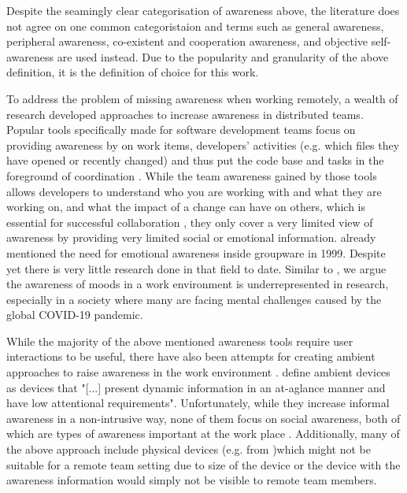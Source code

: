 Despite the seamingly clear categorisation of awareness above, the literature does not agree on one common categoristaion and terms such as general awareness, peripheral awareness, co-existent and cooperation awareness, and objective self-awareness are used instead. Due to the popularity and granularity of the above definition, it is the definition of choice for this work.

To address the problem of missing awareness when working remotely, a wealth of research developed approaches to increase awareness in distributed teams. Popular tools specifically made for software development teams focus on providing awareness by on work items, developers' activities (e.g. which files they have opened or recently changed) and thus put the code base and tasks in the foreground of coordination \autocite{biehl2007fastdash, jakobsen2009wipdash, eick1992seesoft, deline2005easing}. While the team awareness gained by those tools allows developers to understand who you are working with and what they are working on, and what the impact of a change can have on others, which is essential for successful collaboration \autocite{dourish1992awareness}, they only cover a very limited view of awareness by providing very limited social or emotional information. \textcite{garcia1999emotional} already mentioned the need for emotional awareness inside groupware in 1999. Despite yet there is very little research done in that field to date. Similar to \autocite{mora2011supporting}, we argue the awareness of moods in a work environment is underrepresented in research, especially in a society where many are facing mental challenges caused by the global COVID-19 pandemic.

While the majority of the above mentioned awareness tools require user interactions to be useful, there have also been attempts for creating ambient approaches to raise awareness in the work environment \autocite{morrison2020facilitating, otjacques2006ambient, downs2012ambient, alavi2012ambient, rocker2004using}. \textcite{downs2012ambient} define ambient devices as devices that "[...] present dynamic information in an at-aglance manner and have low attentional requirements". Unfortunately, while they increase informal awareness in a non-intrusive way, none of them focus on social awareness, both of which are types of awareness important at the work place \autocite{greenberg1996awareness}. Additionally, many of the above approach include physical devices (e.g. from \autocite{ downs2012ambient, alavi2012ambient, rocker2004using})which might not be suitable for a remote team setting due to size of the device or the device with the awareness information would simply not be visible to remote team members.

